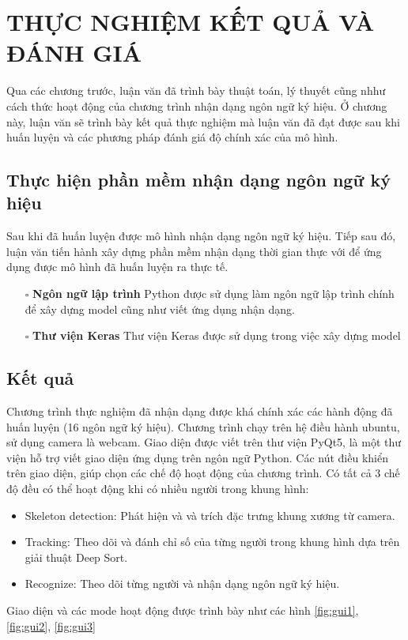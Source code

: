 \chapter{THỰC NGHIỆM KẾT QUẢ VÀ ĐÁNH GIÁ}
Qua các chương trước, luận văn đã trình bày thuật toán, lý thuyết cũng nhhư cách thức hoạt động của chương trình nhận dạng ngôn ngữ ký hiệu. Ở chương này, luận văn sẽ trình bày kết quả thực nghiệm mà luận văn đã đạt được sau khi huấn luyện và các phương pháp đánh giá độ chính xác của mô hình.
\section{Thực hiện phần mềm nhận dạng ngôn ngữ ký hiệu}
Sau khi đã huấn luyện được mô hình nhận dạng ngôn ngữ ký hiệu. Tiếp sau đó, luận văn tiến hành xây dựng phần mềm nhận dạng thời gian thực với để ứng dụng được mô hình đã huấn luyện ra thực tế.
\begin{itemize}
\item[$\square$] \textbf{Ngôn ngữ lập trình}
Python được sử dụng làm ngôn ngữ lập trình chính để xây dựng model cũng như viết ứng dụng nhận dạng.
\item[$\square$] \textbf{Thư viện Keras}
Thư viện Keras được sử dụng trong việc xây dựng model
\end{itemize}


\section{Kết quả}
Chương trình thực nghiệm đã nhận dạng được khá chính xác các hành động đã huấn luyện (16 ngôn ngữ ký hiệu). Chương trình chạy trên hệ điều hành ubuntu, sử dụng camera là webcam. Giao diện được viết trên thư viện PyQt5, là một thư viện hỗ trợ viết giao diện ứng dụng trên ngôn ngữ Python. Các nút điều khiển trên giao diện, giúp chọn các chế độ hoạt động của chương trình. Có tất cả 3 chế độ đều có thể hoạt động khi có nhiều người trong khung hình:
\begin{itemize}
\item Skeleton detection: Phát hiện và và trích đặc trưng khung xương từ camera.
\item Tracking: Theo dõi và đánh chỉ số của từng người trong khung hình dựa trên giải thuật Deep Sort.
\item Recognize: Theo dõi từng người và nhận dạng ngôn ngữ ký hiệu.
\end{itemize}
Giao diện và các mode hoạt động được trình bày như các hình \ref{fig:gui1}, \ref{fig:gui2}, \ref{fig:gui3}

